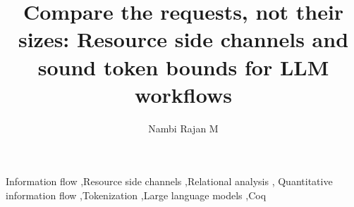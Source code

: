 \documentclass[preprint,12pt,sort&compress,nopreprintline]{elsarticle}
\theoremstyle{plain}
\theoremstyle{definition}
\begin{document}
\begin{frontmatter}

\title{Compare the requests, not their sizes: Resource side channels and sound token bounds for LLM workflows}

\author[vit]{Nambi Rajan M}



\begin{keyword}
Information flow \sep Resource side channels \sep Relational analysis \sep
Quantitative information flow \sep Tokenization \sep Large language models \sep Coq
\end{keyword}

\end{frontmatter}

\linenumbers













\appendix






\end{document}
